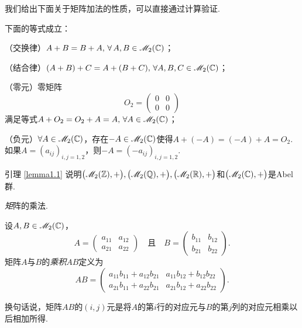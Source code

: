   我们给出下面关于矩阵加法的性质，可以直接通过计算验证.
  \begin{lemma}
    下面的等式成立：
    \begin{enum}
      \item （交换律）$A+B=B+A,\,\forall \,A,B\in\mathscr M_2(\mathbb C)$；
      \item （结合律）$(A+B)+C=A+(B+C),\,\forall A,B,C\in\mathscr M_2(\mathbb C)$；
      \item （零元）零矩阵
      \[
        O_2 = \begin{pmatrix}
          0 & 0 \\
          0 & 0
        \end{pmatrix}
      \]
      满足等式$A+O_2=O_2+A=A,\,\forall A\in\mathscr M_2(\mathbb C)$；
      \item （负元）$\forall A\in\mathscr M_2(\mathbb C)$，存在$-A\in\mathscr M_2(\mathbb C)$使得$A+(-A)=(-A)+A=O_2$. 如果$A=(a_{ij})_{i,j=1,2}$，则$-A=(-a_{ij})_{i,j=1,2}$.
    \end{enum}
  \end{lemma}
  \begin{remark}
    引理 \ref{lemma1.1} 说明$\big(\mathscr M_2(\mathbb Z),+\big),\big(\mathscr M_2(\mathbb Q),+\big),
    \big(\mathscr M_2(\mathbb R),+\big)$和$\big( \mathscr M_2(\mathbb C),+ \big)$是Abel群.
  \end{remark}

  \begin{definition}
    {\emph 矩阵的乘法}.

    设$A,B\in\mathscr M_2(\mathbb C)$，
    \[
      A = \begin{pmatrix}
        a_{11} & a_{12} \\
        a_{21} & a_{22}
      \end{pmatrix}\quad \text{且}\quad
      B = \begin{pmatrix}
        b_{11} & b_{12} \\
        b_{21} & b_{22}
      \end{pmatrix}.
    \]
    矩阵$A$与$B$的\emph{乘积}$AB$定义为
    \[
      AB = \begin{pmatrix}
        a_{11}b_{11} + a_{12}b_{21} & a_{11}b_{12} + b_{12}b_{22} \\
        a_{21}b_{11} + a_{22}b_{21} & a_{21}b_{12} + a_{22}b_{22}
      \end{pmatrix}.
    \]
  \end{definition}

    换句话说，矩阵$AB$的$(i,j)$元是将$A$的第$i$行的对应元与$B$的第$j$列的对应元相乘以后相加所得.

